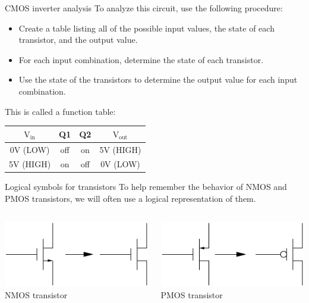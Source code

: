\begin{frame}{CMOS inverter analysis}
  To analyze this circuit, use the following procedure:
  \begin{itemize}
    \item Create a table listing all of the possible input values, the state of each transistor, and the output value.
    \item For each input combination, determine the state of each transistor.
    \item Use the state of the transistors to determine the output value for each input combination.
  \end{itemize}
\end{frame}

This is called a function table:
\begin{tabular}{cccc}
  \textbf{$\textrm{V}_{\textrm{in}}$} & \textbf{Q1} & \textbf{Q2} & \textbf{$\textrm{V}_{\textrm{out}}$} \\
  \hline
  0V (LOW) & off & on & 5V (HIGH)\\
  5V (HIGH) & on & off & 0V (LOW)
\end{tabular}

\begin{frame}{Logical symbols for transistors}
  To help remember the behavior of NMOS and PMOS transistors, we will often use a logical representation of them.
  \vspace{0.5cm}
  \begin{columns}
    \begin{column}{5cm}
      \begin{center}
        \includegraphics{NMOSToNMOSLogical}
        \\
        NMOS transistor
      \end{center}
    \end{column}
    \begin{column}{5cm}
      \begin{center}
        \includegraphics{PMOSToPMOSLogical}
        \\
        PMOS transistor
      \end{center}
    \end{column}
  \end{columns}
\end{frame}

